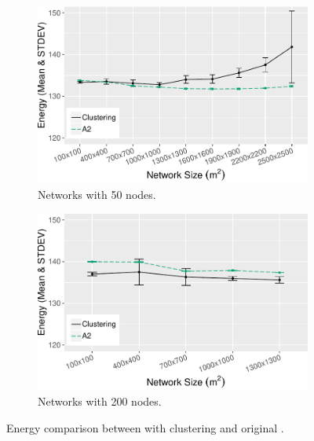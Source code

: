 \begin{figure}[bt]
    \centering
    \begin{subfigure}{0.7\textwidth}
        \centering
        \includegraphics[width=\textwidth]{figure/Results/ChaosComparison/ChaosComparison_50_Energy.pdf}
        \caption{Networks with 50 nodes.}
        \label{subfig:energy-50-nodes}
    \end{subfigure}
    \hfill
    \begin{subfigure}{0.7\textwidth}
        \centering
        \includegraphics[width=\textwidth]{figure/Results/ChaosComparison/ChaosComparison_200_Energy.pdf}
        \caption{Networks with 200 nodes.}
        \label{subfig:energy-200-nodes}
    \end{subfigure}
    \caption{Energy comparison between \atwo{} with clustering and original \atwo{}.}
    \label{fig:energy-results}
\end{figure}


